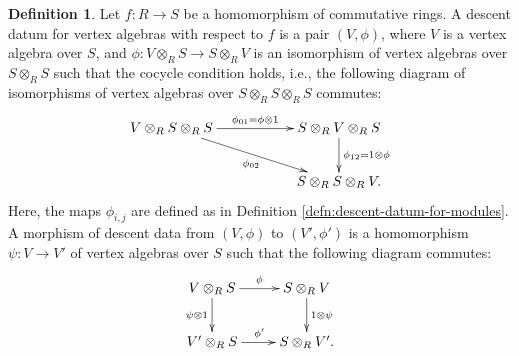 \documentclass[pdftex]{sigma}
\theoremstyle{definition}
\newtheorem{defn}[thm]{Definition}
\begin{document}
\begin{defn}
Let $f\colon R \to S$ be a homomorphism of commutative rings. A descent datum for vertex algebras with respect to $f$ is a pair $(V,\phi)$, where $V$ is a vertex algebra over $S$, and $\phi\colon V \otimes_{R} S \to S \otimes_{R} V$ is an isomorphism of vertex algebras over $S \otimes_{R} S$ such that the cocycle condition holds, i.e., the following diagram of isomorphisms of vertex algebras over $S \otimes_{R} S \otimes_{R} S$ commutes:
\begin{gather*} \xymatrix{ V \otimes_{R} S \otimes_{R} S \ar[rr]^{\phi_{01} = \phi \otimes 1} \ar[rrd]_{\phi_{02}} & & S \otimes_{R} V \otimes_{R} S \ar[d]^{\phi_{12} = 1 \otimes \phi} \\ & & S \otimes_{R} S \otimes_{R} V.} \end{gather*}
Here, the maps $\phi_{i,j}$ are defined as in Definition \ref{defn:descent-datum-for-modules}. A morphism of descent data from $(V, \phi)$ to $(V', \phi')$ is a homomorphism $\psi\colon V \to V'$ of vertex algebras over $S$ such that the following diagram commutes:
\begin{gather*} \xymatrix{ V \otimes_{R} S \ar[r]^{\phi} \ar[d]_{\psi \otimes 1} & S \otimes_{R} V \ar[d]^{1 \otimes \psi} \\
V' \otimes_{R} S \ar[r]^{\phi'} & S \otimes_{R} V'. } \end{gather*}
\end{defn}
\end{document}
